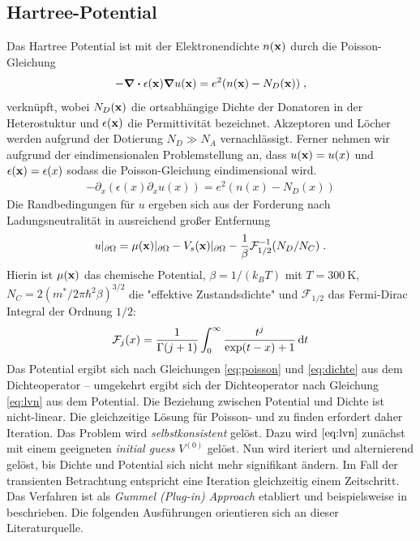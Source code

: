 \subsection{Hartree-Potential}
Das Hartree Potential ist mit der Elektronendichte $n(\vb{x})$ durch die Poisson-Gleichung \cite{frensley}
\begin{align}
  -\div \epsilon(\vb{x}) \grad u(\vb{x}) = e^2 (n(\vb{x}) - N_D(\vb{x})) \; ,
  \label{eq:poisson_3d}
\end{align}
verknüpft, wobei $N_D(\vb{x})$ die ortsabhängige Dichte der Donatoren in der Heterostuktur und $\epsilon(\vb{x})$ die Permittivität bezeichnet. Akzeptoren und Löcher werden aufgrund der Dotierung $N_D \gg N_A$ vernachlässigt. Ferner nehmen wir aufgrund der eindimensionalen Problemstellung an, dass $u(\vb{x}) = u(x)$ und $\epsilon(\vb{x})=\epsilon(x)$ sodass die Poisson-Gleichung eindimensional wird.
\begin{align}
  -\partial_x (\epsilon(x)\partial_x u(x)) = e^2(n(x)-N_D(x))
  \label{eq:poisson}
\end{align}
Die Randbedingungen für $u$ ergeben sich aus der Forderung nach Ladungsneutralität in ausreichend großer Entfernung  \cite{frensley}
\begin{align}
  u|_{\partial\Omega} = \mu(\vb{x})|_{\partial\Omega}-V_s(\vb{x})|_{\partial\Omega}-\frac{1}{\beta}\mathcal{F}_{1/2}^{-1}(N_D/N_C) \; .
  \label{eq:RB_PE}
\end{align}
Hierin ist $\mu(\vb{x})$ das chemische Potential, $\beta=1/(k_BT)$ mit $T=\SI{300}{\kelvin}$, $N_C = 2(m^*/2\pi\hbar^2\beta)^{3/2}$ die "effektive Zustandsdichte" und $\mathcal{F}_{1/2}$ das Fermi-Dirac Integral der Ordnung $1/2$:
\begin{align}
  \mathcal{F}_j(x)=\frac{1}{\Gamma(j+1)}\int_0^{\infty}\frac{t^j}{\exp(t-x)+1}\mathop{}\!\mathrm{d} t
\end{align}
Das Potential ergibt sich nach Gleichungen \eqref{eq:poisson} und \eqref{eq:dichte} aus dem Dichteoperator -- umgekehrt ergibt sich der Dichteoperator nach Gleichung \eqref{eq:lvn} aus dem Potential. Die Beziehung zwischen Potential und Dichte ist nicht-linear. Die gleichzeitige Lösung für Poisson- und \lvn zu finden erfordert daher Iteration. Das Problem wird \emph{selbstkonsistent} gelöst. Dazu wird $\eqref{eq:lvn}$ zunächst mit einem geeigneten \emph{initial guess} $V^{(0)}$ gelöst. Nun wird iteriert und alternierend gelöst, bis Dichte und Potential sich nicht mehr signifikant ändern. Im Fall der transienten Betrachtung entspricht eine Iteration gleichzeitig einem Zeitschritt. Das Verfahren ist als \emph{Gummel (Plug-in) Approach} etabliert und beispielsweise in \cite{gummel} beschrieben. Die folgenden Ausführungen orientieren sich an dieser Literaturquelle.

